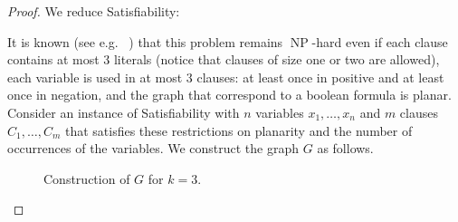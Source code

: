 \documentclass[11pt,a4paper]{article}
\DeclareMathOperator{\operatorClassNP}{NP}
\newcommand{\classNP}{\ensuremath{\operatorClassNP}}
\begin{document}
\begin{proof}
We reduce {\sc Satisfiability}:
\begin{center}
\noindent{}
\end{center}
It is known (see e.g.~
\cite{DahlhausJPSY94}) that this problem remains \classNP-hard even if each clause contains at most 3 literals (notice that clauses of size one or two are allowed), each variable
is used in at most 3 clauses: at least once in positive and at least once in negation, and the graph that correspond to a
boolean formula is planar. Consider an instance of {\sc Satisfiability} with $n$ variables $x_1,\ldots,x_n$ and $m$ clauses
$C_1,\ldots,C_m$ that satisfies these restrictions on planarity and the number of occurrences of the variables. We construct the graph $G$
as follows.


\begin{figure}[ht]
\centering{}
\caption{Construction of $G$ for $k=3$.
\label{fig:NPh}}
\end{figure}




\end{proof}
\end{document}
